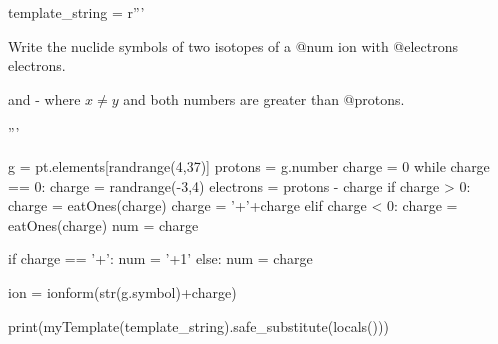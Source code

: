 

\begin{pycode}

template_string = r'''

Write the nuclide symbols of two isotopes of a @num ion with @electrons electrons.

\begin{solution}
 and  - where $x\neq y$ and both numbers are greater than @protons.

\vspace{2\baselineskip}
\end{solution}
'''

g = pt.elements[randrange(4,37)]
protons = g.number
charge = 0
while charge == 0:
	charge = randrange(-3,4)
electrons = protons - charge
if charge > 0:
	charge = eatOnes(charge)
	charge = '+'+charge
elif charge < 0: 
	charge = eatOnes(charge)
	num = charge
	
if charge == '+':
	num = '+1'
else:
	num = charge

ion = ionform(str(g.symbol)+charge)

print(myTemplate(template_string).safe_substitute(locals()))

	
\end{pycode}





